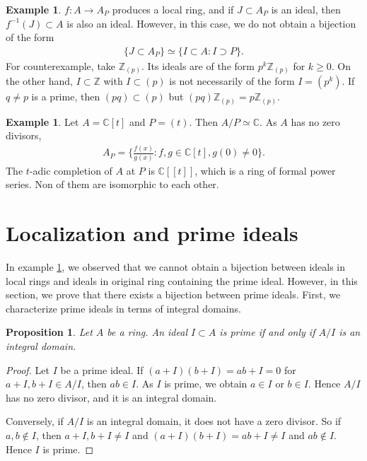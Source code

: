 \documentclass[12pt]{report}
\theoremstyle{plain}
\newtheorem{proposition}[theorem]{Proposition}
\theoremstyle{remark}
\theoremstyle{definition}
\newtheorem{example}[theorem]{Example}
\newcommand{\Z}{\mathbb{Z}}
\newcommand{\C}{\mathbb{C}}
\begin{document}
\begin{example}\label{Example 2.4.6.}
    $f:A\rightarrow A_P$ produces a local ring, and if $J\subset A_P$ is an ideal, then $f^{-1}(J)\subset A$ is also an ideal. However, in this case, we do not obtain a bijection of the form
    \begin{align*}
        \{J\subset A_P\}\simeq \{I\subset A:I\supset P\}.
    \end{align*}
    For counterexample, take $\Z_{(p)}$. Its ideals are of the form $p^k\Z_{(p)}$ for $k\ge 0$. On the other hand, $I\subset \Z$ with $I\subset (p)$ is not necessarily of the form $I=(p^k)$. If $q\neq p$ is a prime, then $(pq)\subset (p)$ but $(pq)\Z_{(p)}=p\Z_{(p)}$.
\end{example}

\begin{example}
    Let $A=\C[t]$ and $P=(t)$. Then $A/P\simeq\C$. As $A$ has no zero divisors,
    \begin{align*}
        A_P=\{\frac{f(x)}{g(x)}:f,g\in \C[t],g(0)\neq 0\}.
    \end{align*}
    The $t$-adic completion of $A$ at $P$ is $\C[[t]]$, which is a ring of formal power series. Non of them are isomorphic to each other.
\end{example}


\section{Localization and prime ideals}
In example \ref{Example 2.4.6.}, we observed that we cannot obtain a bijection between ideals in local rings and ideals in original ring containing the prime ideal. However, in this section, we prove that there exists a bijection between prime ideals. First, we characterize prime ideals in terms of integral domains.

\begin{proposition}
    Let $A$ be a ring. An ideal $I\subset A$ is prime if and only if $A/I$ is an integral domain.
\end{proposition}
\begin{proof}
    Let $I$ be a prime ideal. If $(a+I)(b+I)=ab+I=0$ for $a+I,b+I\in A/I$, then $ab\in I$. As $I$ is prime, we obtain $a\in I$ or $b\in I$. Hence $A/I$ has no zero divisor, and it is an integral domain.

    Conversely, if $A/I$ is an integral domain, it does not have a zero divisor. So if $a,b\notin I$, then $a+I,b+I\neq I$ and $(a+I)(b+I)=ab+I\neq I$ and $ab\notin I$. Hence $I$ is prime.
\end{proof}
\end{document}
